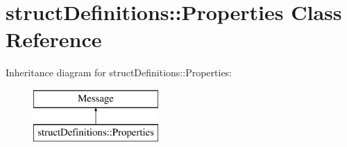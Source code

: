 \hypertarget{classstruct_definitions_1_1_properties}{}\section{struct\+Definitions\+:\+:Properties Class Reference}
\label{classstruct_definitions_1_1_properties}
Inheritance diagram for struct\+Definitions\+:\+:Properties\+:\begin{figure}[H]
\begin{center}
\leavevmode
\includegraphics[height=2.000000cm]{classstruct_definitions_1_1_properties}
\end{center}
\end{figure}
